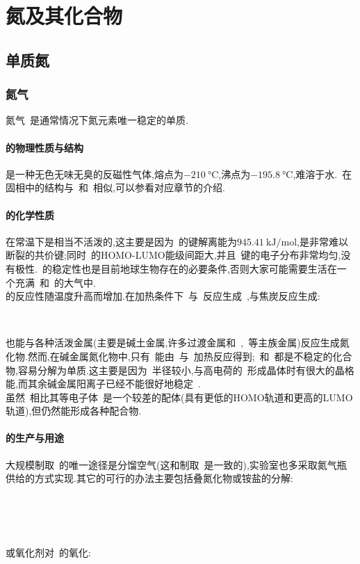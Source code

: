 \documentclass{ctexbook}
\begin{document}
\section{氮及其化合物}
\subsection{单质氮}
\subsubsection{氮气~}
氮气~是通常情况下氮元素唯一稳定的单质.\paragraph{的物理性质与结构}
是一种无色无味无臭的反磁性气体,熔点为$\SI{-210}{\celsius}$,沸点为$\SI{-195.8}{\celsius}$,难溶于水.~在固相中的结构与~和~相似,可以参看对应章节的介绍.
\paragraph{的化学性质}
在常温下是相当不活泼的,这主要是因为~的键解离能为$\SI{945.41}{\kilo\joule\per\mole}$,是非常难以断裂的共价键;同时~的HOMO-LUMO能级间距大,并且~键的电子分布非常均匀,没有极性.~的稳定性也是目前地球生物存在的必要条件,否则大家可能需要生活在一个充满~和~的大气中.\\
\indent {}的反应性随温度升高而增加.在加热条件下~与~反应生成~,与焦炭反应生成:
\begin{tightcenter}
    \\
\end{tightcenter}
也能与各种活泼金属(主要是碱土金属,许多过渡金属和~,~等主族金属)反应生成氮化物.然而,在碱金属氮化物中,只有~能由~与~加热反应得到;~和~都是不稳定的化合物,容易分解为单质.这主要是因为~半径较小,与高电荷的~形成晶体时有很大的晶格能,而其余碱金属阳离子已经不能很好地稳定~.\\
\indent 虽然~相比其等电子体~是一个较差的配体(具有更低的HOMO轨道和更高的LUMO轨道),但仍然能形成各种配合物.
\paragraph{的生产与用途}
大规模制取~的唯一途径是分馏空气(这和制取~是一致的),实验室也多采取氮气瓶供给的方式实现.其它的可行的办法主要包括叠氮化物或铵盐的分解:
\begin{tightcenter}
    \\
    \\
    \\
\end{tightcenter}
或氧化剂对~的氧化:
\begin{tightcenter}
    \\
\end{tightcenter}
\end{document}
